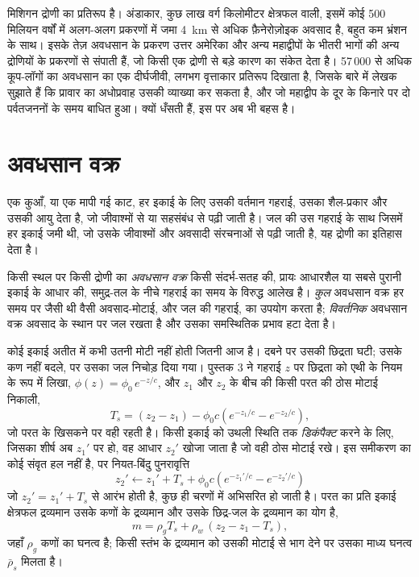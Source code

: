 मिशिगन द्रोणी  का प्रतिरूप है। अंडाकार, कुछ लाख
वर्ग किलोमीटर क्षेत्रफल वाली, इसमें कोई 500 मिलियन वर्षों में अलग-अलग प्रकरणों में जमा \qty{4}{km} से अधिक
फ़ैनेरोज़ोइक अवसाद है, बहुत कम भ्रंशन के साथ। इसके तेज़
अवधसान के प्रकरण उत्तर अमेरिका और अन्य महाद्वीपों के भीतरी भागों की अन्य द्रोणियों के प्रकरणों से संपाती हैं,
जो किसी एक द्रोणी से बड़े कारण का संकेत देता है। 57\,000 से अधिक
कूप-लॉगों का  अवधसान का एक दीर्घजीवी, लगभग वृत्ताकार प्रतिरूप दिखाता है, जिसके बारे में लेखक सुझाते हैं कि
प्रावार का अधोप्रवाह उसकी व्याख्या कर सकता है, और जो महाद्वीप के दूर के किनारे पर दो पर्वतजननों के समय
बाधित हुआ।  क्यों धँसती हैं, इस पर अब भी बहस है।

\section{अवधसान वक्र}\label{sec:b2:basins-compared:curves}

एक कुआँ, या एक मापी गई काट, हर इकाई के लिए उसकी वर्तमान गहराई, उसका शैल-प्रकार और उसकी आयु देता है,
जो जीवाश्मों से या सहसंबंध से पढ़ी जाती है। जल की उस गहराई के साथ जिसमें हर इकाई जमी थी,
जो उसके जीवाश्मों और अवसादी संरचनाओं से पढ़ी जाती है, यह द्रोणी का इतिहास देता है।

\begin{definition}[अवधसान वक्र]\label{def:b2:basins-compared:curve}
किसी स्थल पर किसी द्रोणी का \emph{अवधसान वक्र} किसी संदर्भ-सतह की, प्रायः
आधारशैल या सबसे पुरानी इकाई के आधार की, समुद्र-तल के नीचे गहराई का
समय के विरुद्ध आलेख है। \emph{कुल} अवधसान वक्र हर समय पर जैसी थी वैसी अवसाद-मोटाई,
और जल की गहराई, का उपयोग करता है; \emph{विवर्तनिक} अवधसान वक्र अवसाद के स्थान पर जल रखता है
और उसका समस्थितिक प्रभाव हटा देता है।
\end{definition}

कोई इकाई अतीत में कभी उतनी मोटी नहीं होती जितनी आज है। दबने पर उसकी छिद्रता घटी; उसके कण
नहीं बदले, पर उसका जल निचोड़ दिया गया। पुस्तक 3 ने गहराई
$z$ पर छिद्रता को एथी के नियम के रूप में लिखा, $\phi(z) = \phi_0\,e^{-z/c}$, और
$z_1$ और $z_2$ के बीच की किसी परत की ठोस मोटाई निकाली,
\[
  T_s = (z_2 - z_1) - \phi_0 c\left(e^{-z_1/c} - e^{-z_2/c}\right),
\]
जो परत के खिसकने पर वही रहती है। किसी इकाई को उथली स्थिति तक \emph{डिकंपैक्ट} करने के लिए,
जिसका शीर्ष अब $z_1'$ पर हो, वह आधार $z_2'$ खोजा जाता है जो वही ठोस मोटाई रखे।
इस समीकरण का कोई संवृत हल नहीं है, पर नियत-बिंदु पुनरावृत्ति
\[
  z_2' \leftarrow z_1' + T_s + \phi_0 c\left(e^{-z_1'/c} - e^{-z_2'/c}\right)
\]
जो $z_2' = z_1' + T_s$ से आरंभ होती है, कुछ ही चरणों में अभिसरित हो जाती है। परत का प्रति इकाई क्षेत्रफल द्रव्यमान
उसके कणों के द्रव्यमान और उसके छिद्र-जल के द्रव्यमान का योग है,
\[
  m = \rho_g T_s + \rho_w\,(z_2 - z_1 - T_s),
\]
जहाँ $\rho_g$ कणों का घनत्व है; किसी स्तंभ के द्रव्यमान को उसकी मोटाई से भाग देने पर
उसका माध्य घनत्व $\bar\rho_s$ मिलता है।

